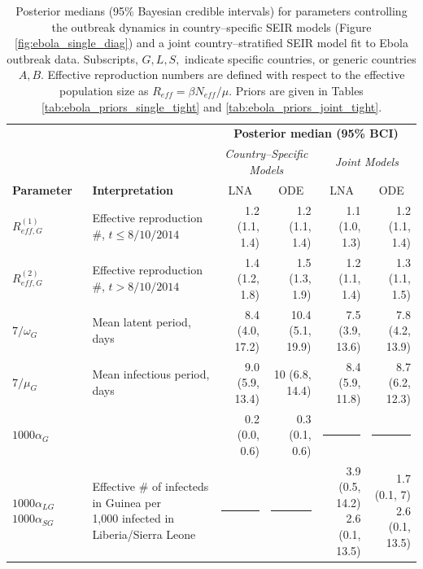 \begin{table}
	\caption[Posterior estimates of outbreak dynamics with country--specific and joint SEIR models fit Ebola outbreak data.]{Posterior medians (95\% Bayesian credible intervals) for parameters controlling the outbreak dynamics in country--specific SEIR models (Figure \ref{fig:ebola_single_diag}) and a joint country--stratified SEIR model fit to Ebola outbreak data. Subscripts, $ G,L,S, $ indicate specific countries, or generic countries $ A,B $. Effective reproduction numbers are defined with respect to the effective population size as $ R_{eff} = \beta N_{eff} /\mu $. Priors are given in Tables \ref{tab:ebola_priors_single_tight} and \ref{tab:ebola_priors_joint_tight}.}
	\label{tab:ebola_dynamic_ests}
	\centering\footnotesize
	\begin{tabular}{llrrrr}
		\hline
		& & \multicolumn{4}{c}{\textbf{Posterior median (95\% BCI)}}\\\cline{3-6}
		&& \multicolumn{2}{c}{\textit{Country--Specific Models}}& \multicolumn{2}{c}{\textit{Joint Models}} \\ 
		\cmidrule(r){3-4}\cmidrule(l){5-6}
		\textbf{Parameter} & \textbf{Interpretation} & \multicolumn{1}{c}{LNA}& \multicolumn{1}{c}{ODE} & \multicolumn{1}{c}{LNA} & \multicolumn{1}{c}{ODE}\\\hline
		$ R_{eff,G}^{(1)} $& Effective reproduction \#, $ t\leq 8/10/2014 $ & 1.2 (1.1, 1.4) & 1.2 (1.1, 1.4) & 1.1 (1.0, 1.3) & 1.2 (1.1, 1.4) \\ 
		$ R_{eff,G}^{(2)} $& Effective reproduction \#, $ t> 8/10/2014 $ & 1.4 (1.2, 1.8) & 1.5 (1.3, 1.9) & 1.2 (1.1, 1.4) & 1.3 (1.1, 1.5) \\
		$ 7/\omega_G $& Mean latent period, days & 8.4 (4.0, 17.2) & 10.4 (5.1, 19.9) & 7.5 (3.9, 13.6) & 7.8 (4.2, 13.9) \\ 
		$ 7/\mu_G $& Mean infectious period, days & 9.0 (5.9, 13.4) & 10 (6.8, 14.4) & 8.4 (5.9, 11.8) &  8.7 (6.2, 12.3) \\ 
		$ 1000\alpha_{G} $& \makecell[l]{Effective \# of baseline infecteds $ \times $ 1,000} & 0.2 (0.0, 0.6) & 0.3 (0.1, 0.6) & \rule[0.5ex]{0.75in}{0.5pt} & \rule[0.5ex]{0.75in}{0.5pt}\\
		\makecell[l]{$ 1000\alpha_{LG} $\\ $ 1000\alpha_{SG} $} & \makecell[l]{Effective \# of infecteds in Guinea per \\ \hspace{0.05in} 1,000 infected in Liberia/Sierra Leone} & \rule[0.5ex]{0.75in}{0.5pt} & \rule[0.5ex]{0.75in}{0.5pt} & \makecell[r]{3.9 (0.5, 14.2) \\ 2.6 (0.1, 13.5)} & \makecell[r]{1.7 (0.1, 7) \\ 2.6 (0.1, 13.5)} \\

\end{tabular}
\end{table}
